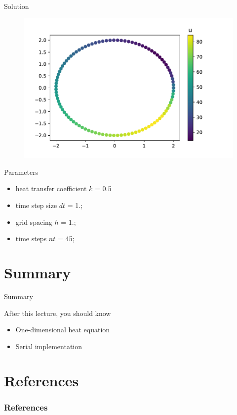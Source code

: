 \documentclass[12pt,t]{beamer}
\begin{document}
\begin{frame}{Solution}
\vspace{-0.5cm}
\begin{figure}
\includegraphics[scale=0.5]{./images/solution.pdf}
\end{figure}
\vspace{-0.5cm}
\begin{block}{Parameters}
\begin{itemize}
\item heat transfer coefficient $k$ = 0.5
\item time step size $dt$ = 1.;
\item grid spacing $h$ = 1.;
\item time steps $nt$ = 45;
\end{itemize}

\end{block}

\end{frame}

\section{Summary}
\begin{frame}{Summary}
\begin{block}{After this lecture, you should know}
\begin{itemize}
\item One-dimensional heat equation
\item Serial implementation
\end{itemize}
\end{block}
\end{frame}


\section{References}

\begin{frame}[t, allowframebreaks]
\frametitle{References}


\end{frame}
\end{document}
